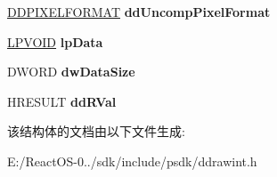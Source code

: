 \begin{DoxyCompactItemize}
\hyperlink{struct___d_d_p_i_x_e_l_f_o_r_m_a_t}{D\+D\+P\+I\+X\+E\+L\+F\+O\+R\+M\+AT} {\bfseries dd\+Uncomp\+Pixel\+Format}
\item 
\mbox{\label{struct___d_d___c_r_e_a_t_e_m_o_c_o_m_p_d_a_t_a_a86521ae4aba20d445c3306cbdb8b6817}} 
\hyperlink{interfacevoid}{L\+P\+V\+O\+ID} {\bfseries lp\+Data}
\item 
\mbox{\label{struct___d_d___c_r_e_a_t_e_m_o_c_o_m_p_d_a_t_a_acfe00c198e640dc91c65044ce4b90940}} 
D\+W\+O\+RD {\bfseries dw\+Data\+Size}
\item 
\mbox{\label{struct___d_d___c_r_e_a_t_e_m_o_c_o_m_p_d_a_t_a_ae4f3183e7a74fef99d9c04ff47dce522}} 
H\+R\+E\+S\+U\+LT {\bfseries dd\+R\+Val}
\end{DoxyCompactItemize}


该结构体的文档由以下文件生成\+:\begin{DoxyCompactItemize}
\item 
E\+:/\+React\+O\+S-\/0../sdk/include/psdk/ddrawint.\+h\end{DoxyCompactItemize}
